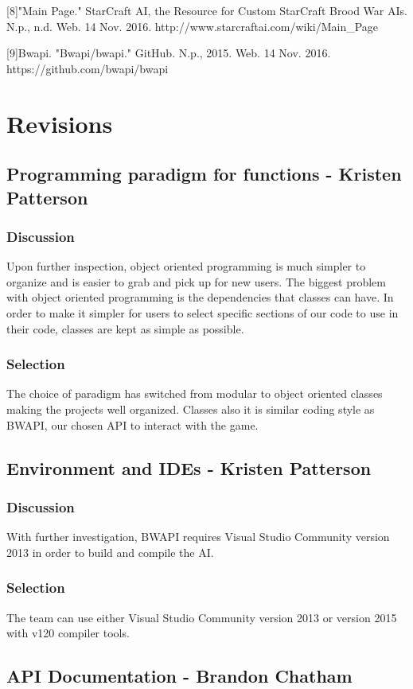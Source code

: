 [8]"Main Page." StarCraft AI, the Resource for Custom StarCraft Brood War AIs. N.p., n.d. Web. 14 Nov. 2016. http://www.starcraftai.com/wiki/Main\_Page

[9]Bwapi. "Bwapi/bwapi." GitHub. N.p., 2015. Web. 14 Nov. 2016.  https://github.com/bwapi/bwapi

\section{Revisions}
\subsection{Programming paradigm for functions - Kristen Patterson}
\subsubsection{Discussion}
Upon further inspection, object oriented programming is much simpler to organize and is easier to grab and pick up for new users. The biggest problem with object oriented programming is the dependencies that classes can have. In order to make it simpler for users to select specific sections of our code to use in their code, classes are kept as simple as possible.
\subsubsection{Selection}
The choice of paradigm has switched from modular to object oriented classes making the projects well organized. Classes also it is similar coding style as BWAPI, our chosen API to interact with the game.

\subsection{Environment and IDEs - Kristen Patterson}
\subsubsection{Discussion}
With further investigation, BWAPI requires Visual Studio Community version 2013 in order to build and compile the AI.
\subsubsection{Selection}
The team can use either Visual Studio Community version 2013 or version 2015 with v120 compiler tools.

\subsection{API Documentation - Brandon Chatham}
